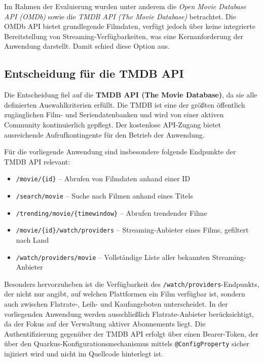 Im Rahmen der Evaluierung wurden unter anderem die \textit{Open Movie Database
API (OMDb)} sowie die \textit{TMDB API (The Movie Database)} betrachtet.
Die OMDb API bietet grundlegende Filmdaten, verfügt jedoch über keine
integrierte Bereitstellung von Streaming-Verfügbarkeiten, was eine
Kernanforderung der Anwendung darstellt. Damit schied diese Option aus.


\subsection{Entscheidung für die TMDB API}

Die Entscheidung fiel auf die \textbf{TMDB API (The Movie Database)}, da
sie alle definierten Auswahlkriterien erfüllt. Die TMDB ist eine der größten
öffentlich zugänglichen Film- und Seriendatenbanken und wird von einer
aktiven Community kontinuierlich gepflegt. Der kostenlose API-Zugang bietet
ausreichende Aufrufkontingente für den Betrieb der Anwendung.

Für die vorliegende Anwendung sind insbesondere folgende Endpunkte der
TMDB API relevant:

\begin{itemize}
    \item \texttt{/movie/\{id\}} -- Abrufen von Filmdaten anhand einer ID
    \item \texttt{/search/movie} -- Suche nach Filmen anhand eines Titels
    \item \texttt{/trending/movie/\{timewindow\}} -- Abrufen trendender Filme
    \item \texttt{/movie/\{id\}/watch/providers} -- Streaming-Anbieter
    eines Films, gefiltert nach Land
    \item \texttt{/watch/providers/movie} -- Vollständige Liste aller
    bekannten Streaming-Anbieter
\end{itemize}

Besonders hervorzuheben ist die Verfügbarkeit des
\texttt{/watch/providers}-Endpunkts, der nicht nur angibt, auf welchen
Plattformen ein Film verfügbar ist, sondern auch zwischen Flatrate-,
Leih- und Kaufangeboten unterscheidet. In der vorliegenden Anwendung
werden ausschließlich Flatrate-Anbieter berücksichtigt, da der Fokus
auf der Verwaltung aktiver Abonnements liegt. Die Authentifizierung
gegenüber der TMDB API erfolgt über einen Bearer-Token, der über den
Quarkus-Konfigurationsmechanismus mittels \texttt{@ConfigProperty}
sicher injiziert wird und nicht im Quellcode hinterlegt ist.
